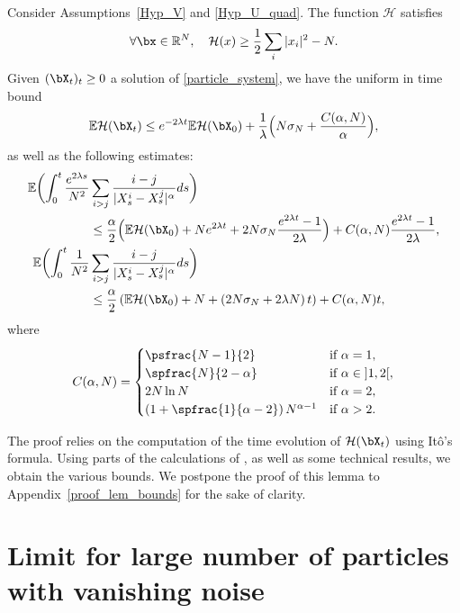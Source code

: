 \begin{lemma}\label{lem:bounds}
Consider Assumptions~\ref{Hyp_V} and \ref{Hyp_U_quad}. The function $\mathcal{H}$ satisfies
\begin{align}\label{borne_H}
\forall \bx\in\mathbb{R}^N,\quad\mathcal{H}(x)\geq \frac{1}{2}\sum_{i}|x_i|^2-N.
\end{align}
Given $(\bX_t)_t\geq0$ a solution of \eqref{particle_system}, we have the uniform in time bound
\begin{align}\label{unif_tps_H}
\mathbb{E}\mathcal{H}(\bX_t)\leq e^{-2\lambda t}\mathbb{E}\mathcal{H}(\bX_0)+\frac{1}{\lambda }\Bigl(N\sigma_N+\frac{C(\alpha,N)}{\alpha}\Bigr),
\end{align}
as well as the following estimates:
\begin{align}
\label{borne_interaction}
\mathbb{E}\biggl(\int_0^t\frac{e^{2\lambda s}}{N^2}&\sum_{i>j}\frac{i-j}{|X^i_s-X^j_s|^{\alpha}}ds\biggr)\\
&\leq\frac{\alpha}{2}\Bigl(\mathbb{E}\mathcal{H}(\bX_0)+Ne^{2\lambda t}+2N\sigma_N \frac{e^{2\lambda t}-1}{2\lambda}\Bigr)+C(\alpha,N)\frac{e^{2\lambda t}-1}{2\lambda},\notag\\
\label{borne_interaction_sup}
\mathbb{E}\biggl(\int_0^t\frac{1}{N^2}&\sum_{i>j}\frac{i-j}{|X^i_s-X^j_s|^{\alpha}}ds\biggr)\\
&\leq\frac{\alpha}{2}\left(\mathbb{E}\mathcal{H}(\bX_0)+N+\left(2N\sigma_N+2\lambda N\right)t\right)+C(\alpha,N)t,\notag
\end{align}
where
\begin{align*}
C(\alpha,N)=\begin{cases}
\psfrac{N-1}{2}&\text{if }\alpha=1,\\
\spfrac{N}{2-\alpha}&\text{if }\alpha\in{}]1,2[,\\
2N\ln N&\text{if }\alpha=2,\\
\left(1+\spfrac{1}{\alpha-2}\right)N^{\alpha-1}&\text{if }\alpha>2.
\end{cases}
\end{align*}
\end{lemma}
The proof relies on the computation of the time evolution of $\mathcal{H}(\bX_t)$ using Itô's formula. Using parts of the calculations of \cite{lu_mattingly}, as well as some technical results, we obtain the various bounds. We postpone the proof of this lemma to Appendix~\ref{proof_lem_bounds} for the sake of clarity.

\section{Limit for large number of particles with vanishing noise}\label{sec_prop}

